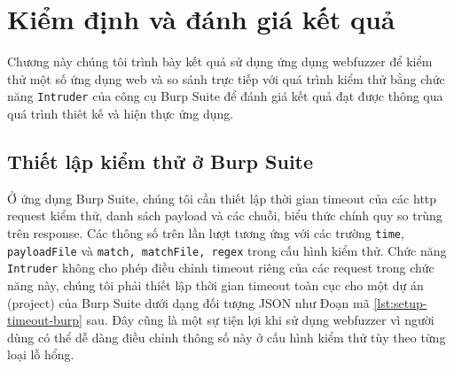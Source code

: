 \chapter{Kiểm định và đánh giá kết quả}
Chương này chúng tôi trình bày kết quả sử dụng ứng dụng webfuzzer để kiểm thử một số ứng dụng web và so sánh trực tiếp với quá trình kiểm thử bằng chức năng \texttt{Intruder} của công cụ Burp Suite để đánh giá kết quả đạt được thông qua quá trình thiêt kế và hiện thực ứng dụng.
\section{Thiết lập kiểm thử ở Burp Suite}
Ở ứng dụng Burp Suite, chúng tôi cần thiết lập thời gian timeout của các \acrshort{http} request kiểm thử, danh sách payload và các chuỗi, biểu thức chính quy so trùng trên response. Các thông số trên lần lượt tương ứng với các trường \texttt{time}, \texttt{payloadFile} và \texttt{match, matchFile, regex} trong cấu hình kiểm thử. Chức năng \texttt{Intruder} không cho phép điều chỉnh timeout riêng của các request trong chức năng này, chúng tôi phải thiết lập thời gian timeout toàn cục cho một dự án (project) của Burp Suite dưới dạng đối tượng JSON như Đoạn mã \ref{lst:setup-timeout-burp} sau. Đây cũng là một sự tiện lợi khi sử dụng webfuzzer vì người dùng có thể dễ dàng điều chỉnh thông số này ở cấu hình kiểm thử tùy theo từng loại lỗ hổng.
